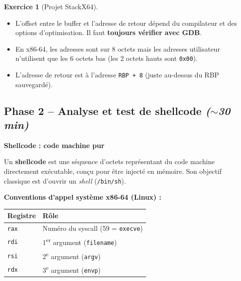 \documentclass[a4paper,11pt]{article}
\theoremstyle{plain}
\theoremstyle{definition}
\newtheorem{exercice}{Exercice}
\begin{document}
\begin{exercice}[Projet StackX64]
\begin{correction}
\begin{pointcle}
\begin{itemize}
    \item L'offset entre le buffer et l'adresse de retour dépend du compilateur et des options d'optimisation. Il faut \textbf{toujours vérifier avec GDB}.
    \item En x86-64, les adresses sont sur 8 octets mais les adresses utilisateur n'utilisent que les 6 octets bas (les 2 octets hauts sont \texttt{0x00}).
    \item L'adresse de retour est à l'adresse \texttt{RBP + 8} (juste au-dessus du RBP sauvegardé).
\end{itemize}
\end{pointcle}

\end{correction}



\subsection*{Phase 2 -- Analyse et test de shellcode \hfill\normalfont\textit{($\sim$30 min)}}

\begin{rappel}
\textbf{Shellcode : code machine pur}

Un \textbf{shellcode} est une séquence d'octets représentant du code machine directement exécutable, conçu pour être injecté en mémoire. Son objectif classique est d'ouvrir un \textit{shell} (\texttt{/bin/sh}).

\medskip
\textbf{Conventions d'appel système x86-64 (Linux) :}
\begin{center}
\begin{tabular}{ll}
\toprule
\textbf{Registre} & \textbf{Rôle} \\
\midrule
\texttt{rax} & Numéro du syscall (59 = \texttt{execve}) \\
\texttt{rdi} & 1\textsuperscript{er} argument (\texttt{filename}) \\
\texttt{rsi} & 2\textsuperscript{e} argument (\texttt{argv}) \\
\texttt{rdx} & 3\textsuperscript{e} argument (\texttt{envp}) \\
\bottomrule
\end{tabular}
\end{center}


\end{rappel}
\end{exercice}
\end{document}
